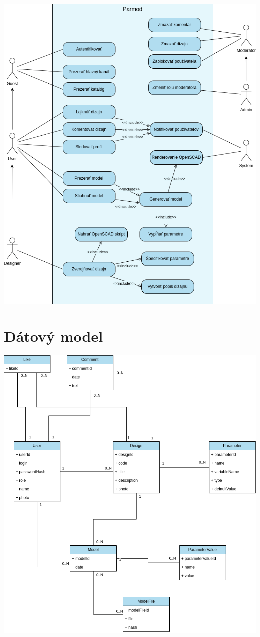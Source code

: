 \documentclass[a4paper]{article}
\begin{document}
\includegraphics[width=\linewidth]{use_case.png}


\section{Dátový model}

\includegraphics[width=\linewidth]{data_model.png}
\end{document}
